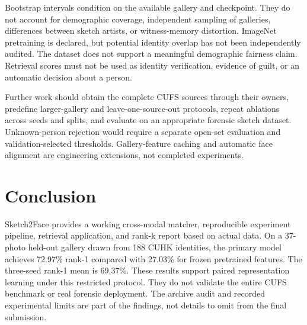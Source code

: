 \documentclass[cameraready]{ieeeconf}
\begin{document}
Bootstrap intervals condition on the available gallery and checkpoint. They do not account for demographic coverage, independent sampling of galleries, differences between sketch artists, or witness-memory distortion. ImageNet pretraining is declared, but potential identity overlap has not been independently audited. The dataset does not support a meaningful demographic fairness claim. Retrieval scores must not be used as identity verification, evidence of guilt, or an automatic decision about a person.


Further work should obtain the complete CUFS sources through their owners, predefine larger-gallery and leave-one-source-out protocols, repeat ablations across seeds and splits, and evaluate on an appropriate forensic sketch dataset. Unknown-person rejection would require a separate open-set evaluation and validation-selected thresholds. Gallery-feature caching and automatic face alignment are engineering extensions, not completed experiments.


\section{Conclusion}

Sketch2Face provides a working cross-modal matcher, reproducible experiment pipeline, retrieval application, and rank-k report based on actual data. On a 37-photo held-out gallery drawn from 188 CUHK identities, the primary model achieves 72.97\% rank-1 compared with 27.03\% for frozen pretrained features. The three-seed rank-1 mean is 69.37\%. These results support paired representation learning under this restricted protocol. They do not validate the entire CUFS benchmark or real forensic deployment. The archive audit and recorded experimental limits are part of the findings, not details to omit from the final submission.
\end{document}
